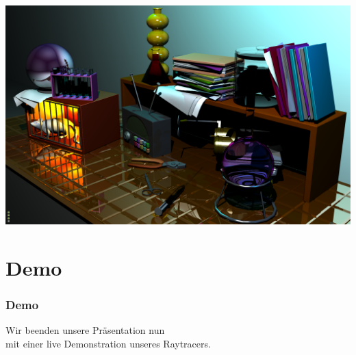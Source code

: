 \documentclass[11pt]{beamer}
\begin{document}
\begin{frame}[allowframebreaks]
\framebreak
\begin{center}
\includegraphics[width=0.95\linewidth]{../madlabcomplete_light}
\end{center}

\end{frame}



\section{Demo}
\begin{frame}
\frametitle{Demo}

\begin{center}
Wir beenden unsere Präsentation nun \\ mit einer live Demonstration unseres Raytracers.
\end{center}
 
\end{frame}
\end{document}
